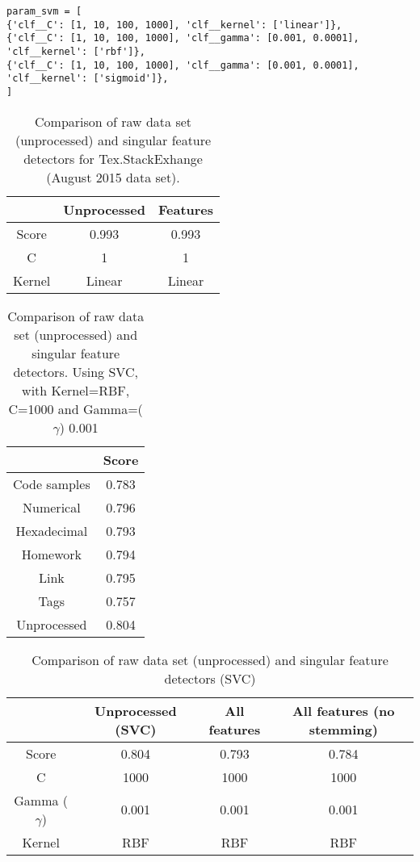 \begin{lstlisting}[caption={Parameters for SVC}, label={lst:param_svc}] 
param_svm = [
{'clf__C': [1, 10, 100, 1000], 'clf__kernel': ['linear']},
{'clf__C': [1, 10, 100, 1000], 'clf__gamma': [0.001, 0.0001], 'clf__kernel': ['rbf']},
{'clf__C': [1, 10, 100, 1000], 'clf__gamma': [0.001, 0.0001], 'clf__kernel': ['sigmoid']},
]
\end{lstlisting}

\begin{table}[!h]%
	\centering
	\begin{tabular}{| c | c | c |}
		\hline
		~ 			& Unprocessed		& Features	\\ \hline
		Score 		& 0.993				& 0.993		\\ \hline
		C			& 1					& 1			\\ \hline
		Kernel		& Linear			& Linear	\\ \hline
	\end{tabular}
	\caption{Comparison of raw data set (unprocessed) and singular feature detectors for Tex.StackExhange (August 2015 data set).}
	\label{tab:singular_feature_detector_tex}
\end{table}


\begin{table}[!h]%
	\centering
	\begin{tabular}{| c | c |}
		\hline
		~ 				& Score	\\ \hline
		Code samples 	& 0.783	\\ \hline
		Numerical		& 0.796	\\ \hline
		Hexadecimal		& 0.793	\\ \hline
		Homework 		& 0.794	\\ \hline
		Link			& 0.795	\\ \hline
		Tags			& 0.757	\\ \hline
		Unprocessed		& 0.804 \\ \hline
	\end{tabular}
	\caption{Comparison of raw data set (unprocessed) and singular feature detectors. Using SVC, with Kernel=RBF, C=1000 and Gamma=($\gamma$) 0.001}
	\label{tab:singular_feature_detector_so}
\end{table}


\begin{table}[!h]%
	\centering
	\begin{tabular}{| c | c | c | c |}
		\hline
		~ 					& Unprocessed (SVC)	& All features	& All features (no stemming)	\\ \hline
		Score 				& 0.804				& 0.793			& 0.784							\\ \hline
		C					& 1000				& 1000			& 1000							\\ \hline
		Gamma ($\gamma$)	& 0.001				& 0.001			&  0.001							\\ \hline
		Kernel				& RBF				& RBF			& RBF							\\ \hline
	\end{tabular}
	\caption{Comparison of raw data set (unprocessed) and singular feature detectors (SVC)}
	\label{tab:unprocessed_vs_all_feature_detectors_svc_so}
\end{table}

